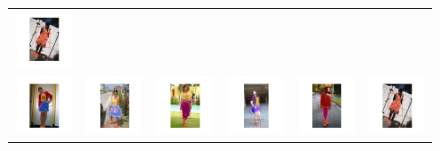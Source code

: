 \begin{figure}[H]
\begin{tabular}{cccccc}
		\includegraphics[width=.15\textwidth ,trim=13cm 5cm 13cm 5cm,clip]{figures/processedimages/28fixedindices/0339823}\\
		\includegraphics[width=.15\textwidth ,trim=13cm 5cm 13cm 5cm,clip]{figures/processedimages/7afteralmostnewwrongdoubleadded/0153056} & 
		\includegraphics[width=.15\textwidth ,trim=13cm 5cm 13cm 5cm,clip]{figures/processedimages/7afteralmostnewwrongdoubleadded/0169465} &
		\includegraphics[width=.15\textwidth ,trim=13cm 5cm 13cm 5cm,clip]{figures/processedimages/7afteralmostnewwrongdoubleadded/0196875} &
		\includegraphics[width=.15\textwidth ,trim=13cm 5cm 13cm 5cm,clip]{figures/processedimages/7afteralmostnewwrongdoubleadded/0201966} &
		\includegraphics[width=.15\textwidth ,trim=13cm 5cm 13cm 5cm,clip]{figures/processedimages/7afteralmostnewwrongdoubleadded/0289352} & 
		\includegraphics[width=.15\textwidth ,trim=13cm 5cm 13cm 5cm,clip]{figures/processedimages/7afteralmostnewwrongdoubleadded/0339823}\\
		

\end{tabular}
\end{figure}
